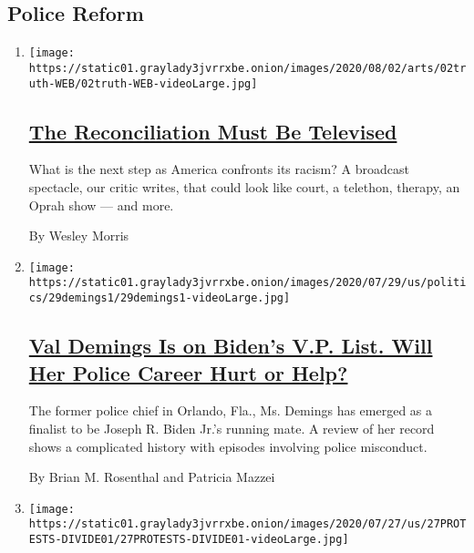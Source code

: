 \hypertarget{police-reform}{%
\subsection{Police Reform}\label{police-reform}}

\begin{enumerate}
\def\labelenumi{\arabic{enumi}.}
\item
  \texttt{[image: https://static01.graylady3jvrrxbe.onion/images/2020/08/02/arts/02truth-WEB/02truth-WEB-videoLarge.jpg]}

  \hypertarget{the-reconciliation-must-be-televised}{%
  \subsection{\texorpdfstring{\href{/2020/07/30/arts/television/the-moment-racism-tv.html}{The
  Reconciliation Must Be
  Televised}}{The Reconciliation Must Be Televised}}\label{the-reconciliation-must-be-televised}}

  What is the next step as America confronts its racism? A broadcast
  spectacle, our critic writes, that could look like court, a telethon,
  therapy, an Oprah show --- and more.

  By Wesley Morris
\item
  \texttt{[image: https://static01.graylady3jvrrxbe.onion/images/2020/07/29/us/politics/29demings1/29demings1-videoLarge.jpg]}

  \hypertarget{val-demings-is-on-bidens-vp-list-will-her-police-career-hurt-or-help}{%
  \subsection{\texorpdfstring{\href{/article/val-demings-biden-vp.html}{Val
  Demings Is on Biden's V.P. List. Will Her Police Career Hurt or
  Help?}}{Val Demings Is on Biden's V.P. List. Will Her Police Career Hurt or Help?}}\label{val-demings-is-on-bidens-vp-list-will-her-police-career-hurt-or-help}}

  The former police chief in Orlando, Fla., Ms. Demings has emerged as a
  finalist to be Joseph R. Biden Jr.'s running mate. A review of her
  record shows a complicated history with episodes involving police
  misconduct.

  By Brian M. Rosenthal and Patricia Mazzei
\item
  \texttt{[image: https://static01.graylady3jvrrxbe.onion/images/2020/07/27/us/27PROTESTS-DIVIDE01/27PROTESTS-DIVIDE01-videoLarge.jpg]}


\end{enumerate}

